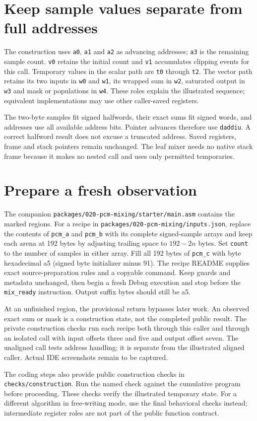 \section{Keep sample values separate from full addresses}
The construction uses \texttt{a0}, \texttt{a1} and \texttt{a2} as advancing addresses;
\texttt{a3} is the remaining sample count. \texttt{v0} retains the initial count and
\texttt{v1} accumulates clipping events for this call. Temporary values in the scalar
path are \texttt{t0} through \texttt{t2}. The vector path retains its two inputs in
\texttt{w0} and \texttt{w1}, its wrapped sum in \texttt{w2}, saturated output in
\texttt{w3} and mask or populations in \texttt{w4}. These roles explain the illustrated
sequence; equivalent implementations may use other caller-saved registers.

The two-byte samples fit signed halfwords, their exact sums fit signed words, and
addresses use all available address bits. Pointer advances therefore use
\texttt{daddiu}. A correct halfword result does not excuse a truncated address.
Saved registers, frame and stack pointers remain unchanged. The leaf mixer needs no
native stack frame because it makes no nested call and uses only permitted temporaries.

\section{Prepare a fresh observation}
The companion \texttt{packages/020-pcm-mixing/starter/main.asm} contains the marked regions.
For a recipe in \texttt{packages/020-pcm-mixing/inputs.json}, replace the contents of
\texttt{pcm\_a} and \texttt{pcm\_b} with its complete signed-sample arrays and keep
each arena at 192 bytes by adjusting trailing space to \(192-2n\) bytes. Set
\texttt{count} to the number of samples in either array. Fill all 192 bytes of
\texttt{pcm\_c} with byte hexadecimal a5 (signed byte initializer minus 91).
The recipe README supplies exact source-preparation rules and a copyable command.
Keep guards and metadata unchanged, then begin a fresh Debug execution and stop
before the \texttt{mix\_ready} instruction. Output suffix bytes should still be a5.

At an unfinished region, the provisional return bypasses later work. An observed
exact sum or mask is a construction state, not the completed public result. The
private construction checks run each recipe both through this caller and through
an isolated call with input offsets three and five and output offset seven. The
unaligned call tests address handling; it is separate from the illustrated aligned
caller. Actual IDE screenshots remain to be captured.

The coding steps also provide public construction checks in
\texttt{checks/construction}. Run the named check against the cumulative program
before proceeding. These checks verify the illustrated temporary state. For a different
algorithm in free-writing mode, use the final behavioral checks instead; intermediate
register roles are not part of the public function contract.
